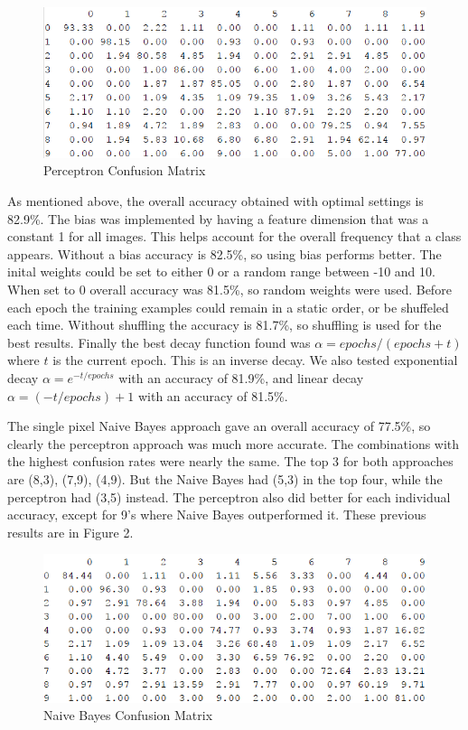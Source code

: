 \documentclass{article}[12pt]
\begin{document}
   
   \begin{figure}[!htb]
   	\centering
   	\includegraphics[scale=0.7]{confusion.png}
   	\caption{Perceptron Confusion Matrix}
   	\label{fig:cm11}
   \end{figure}
   
   As mentioned above, the overall accuracy obtained with optimal settings is 82.9\%. The bias was implemented by having a feature dimension that was a constant 1 for all images. This helps account for the overall frequency that a class appears. Without a bias accuracy is 82.5\%, so using bias performs better. The inital weights could be set to either 0 or a random range between -10 and 10. When set to 0 overall accuracy was 81.5\%, so random weights were used. Before each epoch the training examples could remain in a static order, or be shuffeled each time. Without shuffling the accuracy is 81.7\%, so shuffling is used for the best results. Finally the best decay function found was $\alpha=epochs/(epochs+t)$ where $t$ is the current epoch. This is an inverse decay. We also tested exponential decay $\alpha = e^{-t/epochs}$ with an accuracy of 81.9\%, and linear decay $\alpha = (-t/epochs)+1$ with an accuracy of 81.5\%.
   
   The single pixel Naive Bayes approach gave an overall accuracy of 77.5\%, so clearly the perceptron approach was much more accurate. The combinations with the highest confusion rates were nearly the same. The top 3 for both approaches are (8,3), (7,9), (4,9). But the Naive Bayes had (5,3) in the top four, while the perceptron had (3,5) instead. The perceptron also did better for each individual accuracy, except for 9's where Naive Bayes outperformed it. These previous results are in Figure 2.
   
   \begin{figure}[!htb]
   	\centering
   	\includegraphics[scale=0.5]{confusion_nb.png}
   	\caption{Naive Bayes Confusion Matrix}
   	\label{fig:cm21}
   \end{figure}
   
\end{document}
